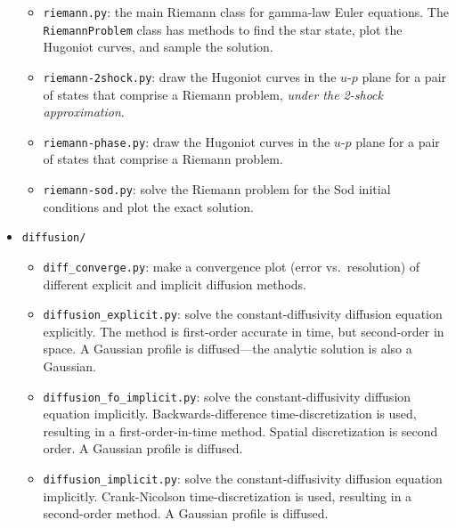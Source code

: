 \begin{itemize}
\begin{itemize}
  \item {\tt riemann.py}: the main Riemann class for gamma-law Euler
    equations.  The {\tt RiemannProblem} class has methods to find
    the star state, plot the Hugoniot curves, and sample the solution.

  \item {\tt riemann-2shock.py}: draw the Hugoniot curves in the $u$-$p$
    plane for a pair of states that comprise a Riemann problem, {\em under
      the 2-shock approximation}.

  \item {\tt riemann-phase.py}: draw the Hugoniot curves in the
    $u$-$p$ plane for a pair of states that comprise a Riemann
    problem.

  \item {\tt riemann-sod.py}: solve the Riemann problem for the Sod
    initial conditions and plot the exact solution.

  \end{itemize}

\item {\tt diffusion/}

  \begin{itemize}
    \item {\tt diff\_converge.py}: make a convergence plot (error
      vs.\ resolution) of different explicit and implicit diffusion
      methods.

    \item {\tt diffusion\_explicit.py}: solve the constant-diffusivity
      diffusion equation explicitly.  The method is first-order
      accurate in time, but second-order in space.  A Gaussian profile
      is diffused---the analytic solution is also a Gaussian.

    \item {\tt diffusion\_fo\_implicit.py}: solve the
      constant-diffusivity diffusion equation implicitly.
      Backwards-difference time-discretization is used, resulting in a
      first-order-in-time method.  Spatial discretization is second
      order.  A Gaussian profile is diffused.

    \item {\tt diffusion\_implicit.py}: solve the constant-diffusivity
      diffusion equation implicitly.  Crank-Nicolson time-discretization
      is used, resulting in a second-order method.  A Gaussian profile
      is diffused.

  \end{itemize}


\end{itemize}
